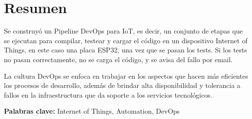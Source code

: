 \chapter*{Resumen}
Se construyó un Pipeline DevOps para IoT, es decir, un conjunto de etapas que se ejecutan para compilar, testear y cargar el código en un dispositivo Internet of Things, en este caso una placa ESP32, una vez que se pasan los tests. Si los tests no pasan correctamente, no se carga el código, y se avisa del fallo por email. 

La cultura DevOps se enfoca en trabajar en los aspectos que hacen más eficientes los procesos de desarrollo, además de brindar alta disponibilidad y tolerancia a fallos en la infraestructura que da soporte a los servicios tecnológicos.

\vspace{.5cm}

\textbf{Palabras clave:} Internet of Things, Automation, DevOps



